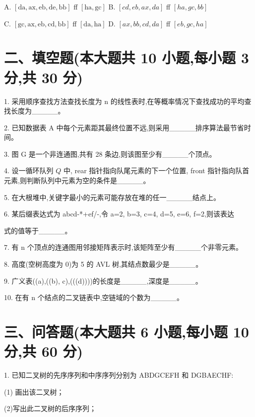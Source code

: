A. \(\left\lbrack  {\mathrm{{da}},\mathrm{{ax}},\mathrm{{eb}},\mathrm{{de}},\mathrm{{bb}}}\right\rbrack\) ff \(\left\lbrack  {\mathrm{{ha}},\mathrm{{gc}}}\right\rbrack\) B. \(\left\lbrack  {{cd},{eb},{ax},{da}}\right\rbrack\) ff \(\left\lbrack  {{ha},{gc},{bb}}\right\rbrack\)

C. \(\left\lbrack  {\mathrm{{gc}},\mathrm{{ax}},\mathrm{{eb}},\mathrm{{cd}},\mathrm{{bb}}}\right\rbrack\) ff \(\left\lbrack  {\mathrm{{da}},\mathrm{{ha}}}\right\rbrack\) D. \(\left\lbrack  {{ax},{bb},{cd},{da}}\right\rbrack\) ff \(\left\lbrack  {{eb},{gc},{ha}}\right\rbrack\)

\section*{二、填空题(本大题共 10 小题,每小题 3 分,共 30 分)}

1. 采用顺序查找方法查找长度为 \(\mathrm{n}\) 的线性表时,在等概率情况下查找成功的平均查找长度为\_\_\_\_\_。

2. 已知数据表 A 中每个元素距其最终位置不远,则采用\_\_\_\_\_排序算法最节省时间。

3. 图 G 是一个非连通图,共有 28 条边,则该图至少有\_\_\_\_\_个顶点。

4. 设一循环队列 \(Q\) 中, rear 指针指向队尾元素的下一个位置, front 指针指向队首元素,则判断队列中元素为空的条件是\_\_\_\_\_。

5. 在大根堆中,关键字最小的元素可能存放在堆的任一\_\_\_\_\_结点上。

6. 某后缀表达式为 abcd-*+ef/-,令 a=2, b=3, c=4, d=5, e=6, f=2,则该表达

式的值等于\_\_\_\_\_。

7. 有 \(\mathrm{n}\) 个顶点的连通图用邻接矩阵表示时,该矩阵至少有\_\_\_\_\_个非零元素。

8. 高度(空树高度为 0)为 5 的 AVL 树,其结点数最少是\_\_\_\_\_。

9. 广义表((a),((b), c),(((d))))的长度是\_\_\_\_\_,深度是\_\_\_\_\_。

10. 在有 n 个结点的二叉链表中,空链域的个数为\_\_\_\_\_。

\section*{三、问答题(本大题共 6 小题,每小题 10 分,共 60 分)}

1. 已知二叉树的先序序列和中序序列分别为 ABDGCEFH 和 DGBAECHF:

(1) 画出该二叉树；

(2)写出此二叉树的后序序列；


